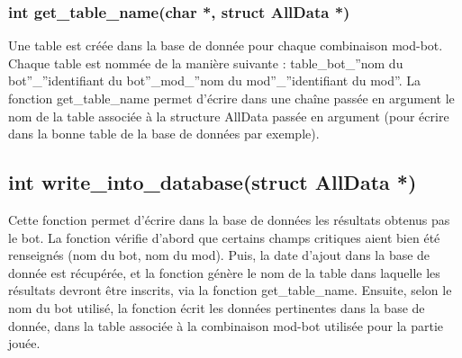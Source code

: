 \subsubsection{int get\_table\_name(char *, struct AllData *)}
Une table est créée dans la base de donnée pour chaque combinaison mod-bot. Chaque table est nommée de la manière suivante : table\_bot\_''nom du bot''\_''identifiant du bot''\_mod\_''nom du mod''\_''identifiant du mod''. La fonction get\_table\_name permet d'écrire dans une chaîne passée en argument le nom de la table associée à la structure AllData passée en argument (pour écrire dans la bonne table de la base de données par exemple).
\subsection{int write\_into\_database(struct AllData *)}
Cette fonction permet d'écrire dans la base de données les résultats obtenus pas le bot. La fonction vérifie d'abord que certains champs critiques aient bien été renseignés (nom du bot, nom du mod). Puis, la date d'ajout dans la base de donnée est récupérée, et la fonction génère le nom de la table dans laquelle les résultats devront être inscrits, via la fonction get\_table\_name. Ensuite, selon le nom du bot utilisé, la fonction écrit les données pertinentes dans la base de donnée, dans la table associée à la combinaison mod-bot utilisée pour la partie jouée.
